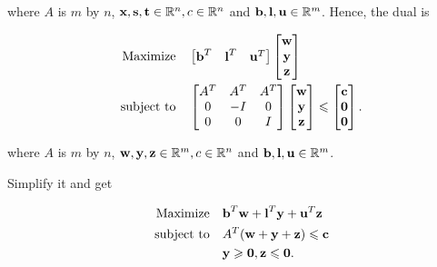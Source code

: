 \documentclass[12pt]{article}
\begin{document}
\begin{enumerate}
where $A$ is $m$ by $n$, $\textbf x, \textbf s, \textbf t \in\mathbb R^n, c\in\mathbb R^n $ and $\textbf b, \textbf l, \textbf u\in \mathbb R^m$.
Hence, the dual is 

\begin{equation}\label{p5c_dual}
\begin{aligned}
\quad \text{Maximize} \quad & \begin{bmatrix}
\textbf b^T & \textbf l^T & \textbf u^T
\end{bmatrix}\begin{bmatrix}
\textbf w \\ \textbf y \\ \textbf z
\end{bmatrix}\\
\text{subject\  to} \quad &\begin{bmatrix}
A^T & A^T & A^T \\
0 & -I & 0 \\
0 & 0 & I
\end{bmatrix}
\begin{bmatrix}
\textbf w \\ \textbf y \\ \textbf z
\end{bmatrix} \leqslant \begin{bmatrix}
\textbf c \\ \textbf 0 \\ \textbf 0
\end{bmatrix}.
\end{aligned}
\end{equation}

where $A$ is $m$ by $n$, $\textbf w, \textbf y, \textbf z \in\mathbb R^m, c\in\mathbb R^n $ and $\textbf b, \textbf l, \textbf u\in \mathbb R^m$.

Simplify it and get

\begin{equation}\label{p5c_dual_simple}
\begin{aligned}
 \quad \text{Maximize} \quad & \textbf b^T\textbf w + \textbf l^T\textbf y + \textbf u^T\textbf z\\
\text{subject\  to} \quad & A^T(\textbf w + \textbf y + \textbf z ) \leqslant \textbf c \\
& \textbf y \geqslant \textbf 0, \textbf z \leqslant \textbf 0.
\end{aligned}
\end{equation}

\end{enumerate}
\end{document}
